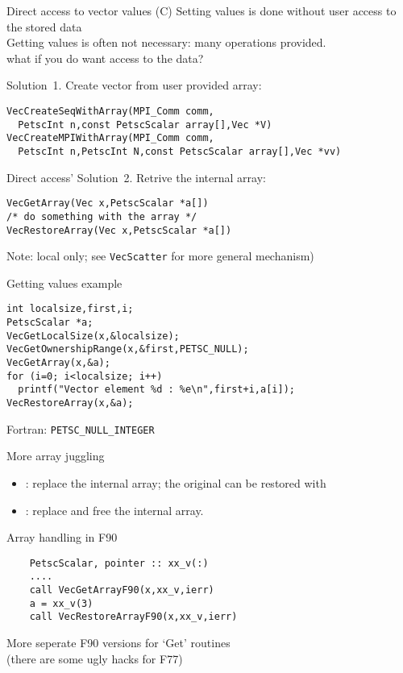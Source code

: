 \begin{details}
\begin{numberedframe}{Direct access to vector values (C)}
 Setting values is done without user access to the stored data\\
 Getting values is often not necessary: many operations provided.\\
 what if you do want access to the data?

 Solution~1. Create vector from user provided array:
\begin{lstlisting}
VecCreateSeqWithArray(MPI_Comm comm,
  PetscInt n,const PetscScalar array[],Vec *V)
VecCreateMPIWithArray(MPI_Comm comm,
  PetscInt n,PetscInt N,const PetscScalar array[],Vec *vv)
\end{lstlisting}
\end{numberedframe}

\begin{numberedframe}{Direct access'}
  Solution~2.
  Retrive the internal array:
\begin{lstlisting}
VecGetArray(Vec x,PetscScalar *a[])
/* do something with the array */
VecRestoreArray(Vec x,PetscScalar *a[])
\end{lstlisting}
Note: local only; see \lstinline{VecScatter} for more general
mechanism)
\end{numberedframe}

\begin{numberedframe}{Getting values example}
\begin{lstlisting}
int localsize,first,i;
PetscScalar *a;
VecGetLocalSize(x,&localsize);
VecGetOwnershipRange(x,&first,PETSC_NULL);
VecGetArray(x,&a);
for (i=0; i<localsize; i++)
  printf("Vector element %d : %e\n",first+i,a[i]);
VecRestoreArray(x,&a);
\end{lstlisting}
Fortran: \lstinline{PETSC_NULL_INTEGER}
\end{numberedframe}

\begin{numberedframe}{More array juggling}
  \begin{itemize}
  \item
    : replace the internal array;
    the original can be restored with 
  \item {}: replace and free the internal array.
  \end{itemize}
\end{numberedframe}

\lstset{language=Fortran}
\begin{fortran}
\begin{numberedframe}{Array handling in F90}
\begin{lstlisting}
    PetscScalar, pointer :: xx_v(:)
    ....
    call VecGetArrayF90(x,xx_v,ierr)
    a = xx_v(3)
    call VecRestoreArrayF90(x,xx_v,ierr)
\end{lstlisting}
More seperate F90 versions for `Get' routines\\
(there are some ugly hacks for F77)
\end{numberedframe}
\end{fortran}

\end{details}
\lstset{language=C}

